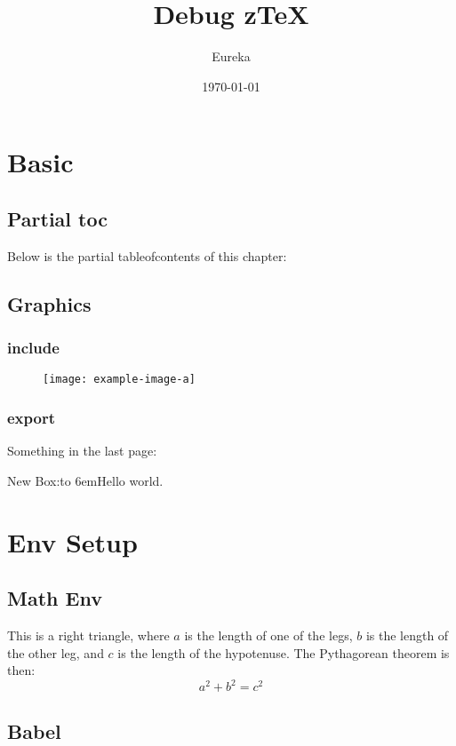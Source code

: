 \documentclass[
  hyper, fancy,
  class=book,
]{zlatex}
\title{Debug z\TeX{}}
\author{Eureka}
\date{\today}
\begin{document}
\maketitle
\tableofcontents
\chapter{Basic}
\section{Partial toc}
Below is the partial tableofcontents of this chapter:

\partialToc


\section{Graphics}
\subsection{include}
\begin{figure}[!htb]
  \centering
  \texttt{[image: example-image-a]}
\end{figure}


\subsection{export}
Something in the last page: \pageref{zslide-last-page}

New Box:\hbox to 6em{Hello\hfill} world.


\chapter{Env Setup}
\section{Math Env}
\begin{theorem}\label{pythagorean}
  This is a right triangle, where $a$ is the length of one of the legs, $b$ is the length of the other leg, 
  and $c$ is the length of the hypotenuse. The Pythagorean theorem is then:
  \begin{equation}
    a^2 + b^2 = c^2
  \end{equation}
\end{theorem}


\section{Babel}
\makeatletter
{}
\makeatother
\end{document}
